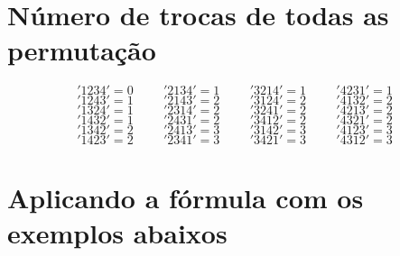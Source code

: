\documentclass{article}
\begin{document}
    \section{Número de trocas de todas as permutação}
    
        \[ '1234' = 0 \hspace{1cm} '2134' = 1 \hspace{1cm} '3214' = 1 \hspace{1cm} '4231' = 1\] 
        \[ '1243' = 1 \hspace{1cm} '2143' = 2 \hspace{1cm} '3124' = 2 \hspace{1cm} '4132' = 2\] 
        \[ '1324' = 1 \hspace{1cm} '2314' = 2 \hspace{1cm} '3241' = 2 \hspace{1cm} '4213' = 2\] 
        \[ '1432' = 1 \hspace{1cm} '2431' = 2 \hspace{1cm} '3412' = 2 \hspace{1cm} '4321' = 2\]
        \[ '1342' = 2 \hspace{1cm} '2413' = 3 \hspace{1cm} '3142' = 3 \hspace{1cm} '4123' = 3\] 
        \[ '1423' = 2 \hspace{1cm} '2341' = 3 \hspace{1cm} '3421' = 3 \hspace{1cm} '4312' = 3\] 
    
    \section {Aplicando a fórmula com os exemplos abaixos}
    
\end{document}
